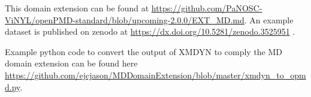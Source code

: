 \documentclass[11pt, a4paper]{article}
\begin{document}
This domain extension can be found at \url{https://github.com/PaNOSC-ViNYL/openPMD-standard/blob/upcoming-2.0.0/EXT_MD.md}.
An example dataset is published on zenodo at \url{https://dx.doi.org/10.5281/zenodo.3525951}
\cite{Juncheng:zenodo2019}.

Example python code to convert the output of XMDYN to comply the MD domain extension can be found here
\url{https://github.com/ejcjason/MDDomainExtension/blob/master/xmdyn_to_opmd.py}.
\printbibliography
\end{document}
